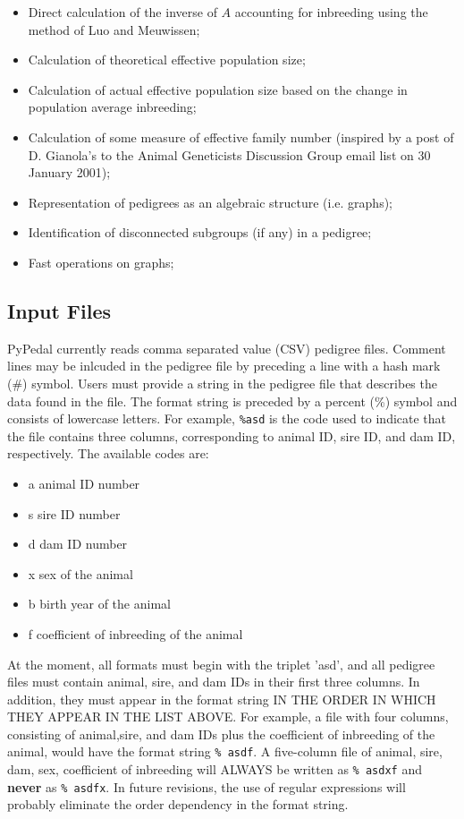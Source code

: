 \begin{itemize}
\item Direct calculation of the inverse of $A$ accounting for inbreeding using the method of Luo and Meuwissen;
\item Calculation of theoretical effective population size;
\item Calculation of actual effective population size based on the change in population average inbreeding;
\item Calculation of some measure of effective family number (inspired by a post of D. Gianola's to the Animal Geneticists Discussion Group email list on 30 January 2001);
\item Representation of pedigrees as an algebraic structure (i.e. graphs);
\item Identification of disconnected subgroups (if any) in a pedigree;
\item Fast operations on graphs;
\end{itemize}

\subsection{Input Files}
PyPedal currently reads comma separated value (CSV) pedigree files.  Comment lines may be inlcuded in the pedigree file by preceding a line with a hash mark (\#) symbol.  Users must provide a string in the pedigree file that describes the data found in the file.  The format string is preceded by a percent (\%) symbol and consists of lowercase letters.  For example, \texttt{\%asd} is the code used to indicate that the file contains three columns, corresponding to animal ID, sire ID, and dam ID, respectively.  The available codes are:

\begin{itemize}
\item a  animal ID number
\item s  sire ID number
\item d  dam ID number
\item x  sex of the animal
\item b  birth year of the animal
\item f  coefficient of inbreeding of the animal
\end{itemize}


At the moment, all formats must begin with the triplet 'asd', and all pedigree files must contain animal, sire, and dam IDs in their first three columns.  In addition, they must appear in the format string IN THE ORDER IN WHICH THEY APPEAR IN THE LIST ABOVE.  For example, a file with four columns, consisting of animal,sire, and dam IDs plus the coefficient of inbreeding of the animal, would have the  format string \texttt{\% asdf}.  A five-column file of animal, sire, dam, sex, coefficient of inbreeding will ALWAYS be written as \texttt{\% asdxf} and \textbf{never} as \texttt{\% asdfx}.  In future revisions, the use of regular expressions will probably eliminate the order dependency in the format string.

